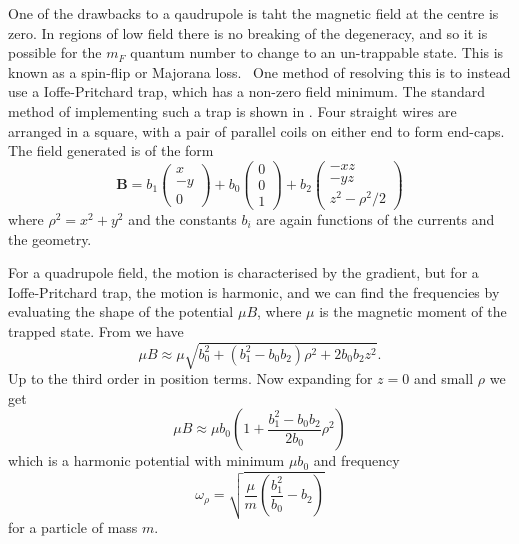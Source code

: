 One of the drawbacks to a qaudrupole is taht the magnetic field at the centre
is zero. In regions of low field there is no breaking of the degeneracy, and so
it is possible for the $m_F$ quantum number to change to an un-trappable state.
This is known as a spin-flip or Majorana loss.~\cite{} One method of resolving
this is to instead use a Ioffe-Pritchard trap, which has a non-zero field
minimum. The standard method of implementing such a trap is shown in
. Four straight wires are arranged in a
square, with a pair of parallel coils on either end to form end-caps. The field
generated is of the form~\cite{}
%
\begin{equation}
  \mathbf{B} = b_1 \begin{pmatrix} x \\ -y \\ 0 \end{pmatrix}
  + b_0 \begin{pmatrix} 0 \\ 0 \\ 1 \end{pmatrix}
  + b_2 \begin{pmatrix} -xz \\ -yz \\ z^2 - \rho^2/2 \end{pmatrix}
  \label{theory:eqn:IP}
\end{equation}
%
where $\rho^2 = x^2 + y^2$ and the constants $b_i$ are again functions
of the currents and the geometry.

For a quadrupole field, the motion is characterised by the gradient, but for a
Ioffe-Pritchard trap, the motion is harmonic, and we can find the frequencies
by evaluating the shape of the potential $\mu B$, where $\mu$ is the magnetic
moment of the trapped state. From  we have
%
\begin{equation}
  \mu B \approx \mu \sqrt{b_0^2 + (b_1^2 -
  b_0b_2)\rho^2 + 2b_0b_2z^2}.
\end{equation}
%
Up to the third order in position terms. Now expanding for $z=0$ and small $\rho$ we get
%
\begin{equation}
  \mu B \approx \mu b_0\left(1 + \frac{b_1^2 -
    b_0b_2}{2b_0}\rho^2\right)
\end{equation}
%
which is a harmonic potential with minimum $\mu b_0$ and frequency
%
\begin{equation}
  \omega_\rho = \sqrt{\frac{\mu}{m}\left(\frac{b_1^2}{b_0}-b_2\right)}
\end{equation}
%
for a particle of mass $m$.

